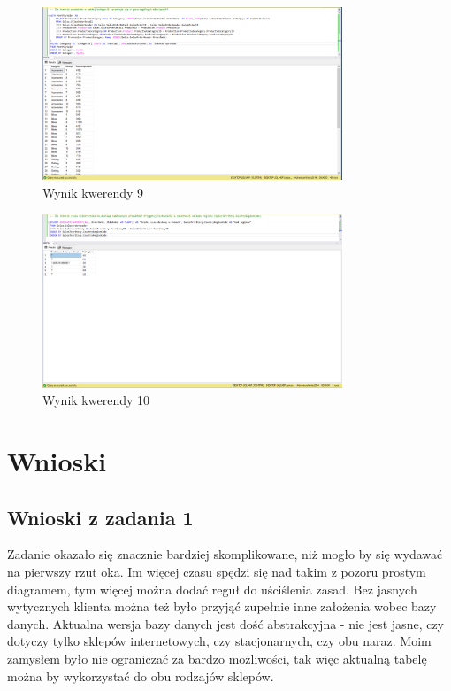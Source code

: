 \documentclass[a4paper,12pt]{article}
\begin{document}
\begin{figure}[H]
    \centering
    \includegraphics[width=0.8\textwidth]{images/09.png}
    \caption{Wynik kwerendy 9}
    \end{figure}

\begin{figure}[H]
    \centering
    \includegraphics[width=0.8\textwidth]{images/10.png}
    \caption{Wynik kwerendy 10}
    \end{figure}

\section{Wnioski}

\subsection{Wnioski z zadania 1}

Zadanie okazało się znacznie bardziej skomplikowane, niż mogło by się wydawać na pierwszy rzut oka. Im więcej czasu spędzi się nad takim z pozoru prostym diagramem, tym więcej można dodać reguł do uściślenia zasad. Bez jasnych wytycznych klienta można też było przyjąć zupełnie inne założenia wobec bazy danych. Aktualna wersja bazy danych jest dość abstrakcyjna - nie jest jasne, czy dotyczy tylko sklepów internetowych, czy stacjonarnych, czy obu naraz. Moim zamysłem było nie ograniczać za bardzo możliwości, tak więc aktualną tabelę można by wykorzystać do obu rodzajów sklepów.
\end{document}
